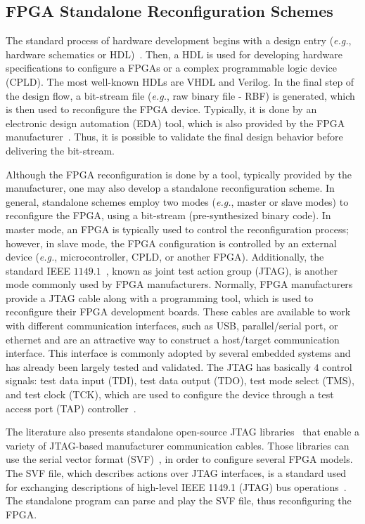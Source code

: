 \subsection{FPGA Standalone Reconfiguration Schemes}
\label{fpga-standalone}

The standard process of hardware development begins with a design entry ({\em e.g.}, hardware schematics or HDL)~\cite{ref28}. Then, a HDL is used for developing hardware specifications to configure a FPGAs or a complex programmable logic device (CPLD). The most well-known HDLs are VHDL and Verilog. In the final step of the design flow, a bit-stream file ({\em e.g.}, raw binary file - RBF) is generated, which is then used to reconfigure the FPGA device. Typically, it is done by an electronic design automation (EDA) tool, which is also provided by the FPGA manufacturer~\cite{ref28}. Thus, it is possible to validate the final design behavior before delivering the bit-stream.

Although the FPGA reconfiguration is done by a tool, typically provided by the manufacturer, one may also develop a standalone reconfiguration scheme. In general, standalone schemes employ two modes ({\em e.g.}, master or slave modes) to reconfigure the FPGA, using a bit-stream (pre-synthesized binary code). In master mode, an FPGA is typically used to control the reconfiguration process; however, in slave mode, the FPGA configuration is controlled by an external device ({\em e.g.}, microcontroller, CPLD, or another FPGA). Additionally, the standard IEEE $1149.1$~\cite{ref29}, known as joint test action group (JTAG), is another mode commonly used by FPGA manufacturers. Normally, FPGA manufacturers provide a JTAG cable along with a programming tool, which is used to reconfigure their FPGA development boards. These cables are available to work with different communication interfaces, such as USB, parallel/serial port, or ethernet and are an attractive way to construct a host/target communication interface. This interface is commonly adopted by several embedded systems and has already been largely tested and validated. The JTAG has basically $4$ control signals: test data input (TDI), test data output (TDO), test mode select (TMS), and test clock (TCK), which are used to configure the device through a test access port (TAP) controller~\cite{ref29}. 

The literature also presents standalone open-source JTAG libraries~\cite{ref30,ref31} that enable a variety of JTAG-based manufacturer communication cables. Those libraries can use the serial vector format (SVF)~\cite{ref32}, in order to configure several FPGA models. The SVF file, which describes actions over JTAG interfaces, is a standard used for exchanging descriptions of high-level IEEE 1149.1 (JTAG) bus operations~\cite{ref32}. The standalone program can parse and play the SVF file, thus reconfiguring the FPGA.

